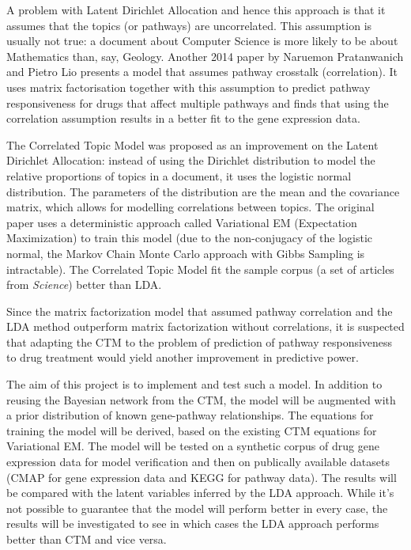\documentclass[12pt,a4]{article}
\begin{document}
A problem with Latent Dirichlet Allocation and hence this approach is that it assumes that the topics (or pathways) are uncorrelated. This assumption is usually not true: a document about Computer Science is more likely to be about Mathematics than, say, Geology. Another 2014 paper\cite{C4MB00014E} by Naruemon Pratanwanich and Pietro Lio presents a model that assumes pathway crosstalk (correlation). It uses matrix factorisation together with this assumption to predict pathway responsiveness for drugs that affect multiple pathways and finds that using the correlation assumption results in a better fit to the gene expression data.

The Correlated Topic Model\cite{2007} was proposed as an improvement on the Latent Dirichlet Allocation: instead of using the Dirichlet distribution to model the relative proportions of topics in a document, it uses the logistic normal distribution. The parameters of the distribution are the mean and the covariance matrix, which allows for modelling correlations between topics. The original paper\cite{2007} uses a deterministic approach called Variational EM (Expectation Maximization) to train this model (due to the non-conjugacy of the logistic normal, the Markov Chain Monte Carlo approach with Gibbs Sampling is intractable). The Correlated Topic Model fit the sample corpus (a set of articles from \textit{Science}) better than LDA\cite{2007}.

Since the matrix factorization model that assumed pathway correlation\cite{C4MB00014E} and the LDA method\cite{Pratanwanich2014} outperform matrix factorization without correlations, it is suspected that adapting the CTM to the problem of prediction of pathway responsiveness to drug treatment would yield another improvement in predictive power.

The aim of this project is to implement and test such a model. In addition to reusing the Bayesian network from the CTM, the model will be augmented with a prior distribution of known gene-pathway relationships. The equations for training the model will be derived, based on the existing CTM equations for Variational EM\cite{2007}. The model will be tested on a synthetic corpus of drug gene expression data for model verification and then on publically available datasets (CMAP\cite{CMap} for gene expression data and KEGG\cite{KEGG} for pathway data). The results will be compared with the latent variables inferred by the LDA approach. While it's not possible to guarantee that the model will perform better in every case, the results will be investigated to see in which cases the LDA approach performs better than CTM and vice versa.
\end{document}
